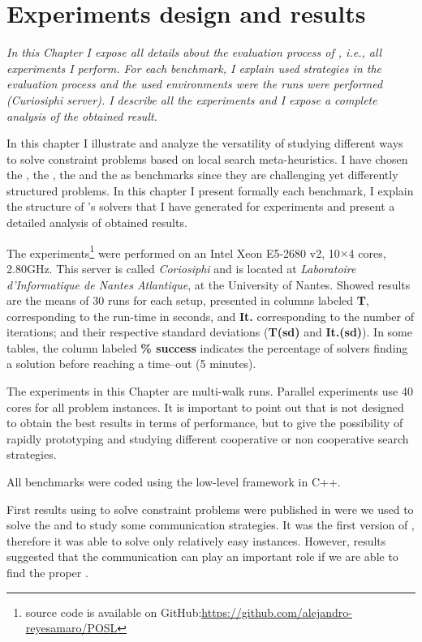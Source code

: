 \chapter{Experiments design and results}
\label{chap:expe}
\textit{In this Chapter I expose all details about the evaluation process of \posl{}, i.e., all experiments I perform. For each benchmark, I explain used strategies in the evaluation process and the used environments were the runs were performed (\textit{Curiosiphi} server). %
I describe all the experiments and I expose a complete analysis of the obtained result.}
\vfill
\minitoc
\newpage

In this chapter I illustrate and analyze the versatility of \posl{} studying different ways to solve constraint problems based on local search meta-heuristics. 
I have chosen the \sgp, the \nqp, the \carrp{} and the \grp{} as benchmarks since they are challenging yet differently structured problems. In this chapter I present formally each benchmark, I explain the structure of \posl's solvers that I have generated for experiments and present a detailed analysis of obtained results.

The experiments\footnote{\posl{} source code is available on GitHub:\href{https://github.com/alejandro-reyesamaro/POSL}{https://github.com/alejandro-reyesamaro/POSL}} 
were performed on an Intel\R{} Xeon\TM{} E5-2680 v2, 10$\times$4 cores, 2.80GHz. This server is called \textit{Coriosiphi} and is located at \textit{Laboratoire d'Informatique de Nantes Atlantique}, at the University of Nantes. Showed results are the means of 30 runs for each setup, presented in columns labeled {\bf T}, corresponding to the run-time in seconds, and {\bf It.} corresponding to the number of iterations; and their respective standard deviations ({\bf T(sd)} and {\bf It.(sd)}). In some tables, the column labeled \textbf{\% success} indicates the percentage of solvers finding a solution before reaching a time--out (5 minutes).

The experiments in this Chapter are multi-walk runs. Parallel experiments use 40 cores for all problem instances. It is important to point out that \posl{} is not designed to obtain the best results in terms of performance, but to give the possibility of rapidly prototyping and studying different cooperative or non cooperative search strategies.

All benchmarks were coded using the \posl{} low-level framework in C++.

First results using \posl{} to solve constraint problems were published in \cite{Reyes-amaro} were we used \posl{} to solve the \sgp{} and to study some communication strategies. It was the first version of \posl{}, therefore it was able to solve only relatively easy instances. However, results suggested that the communication can play an important role if we are able to find the proper \commstr{}.

